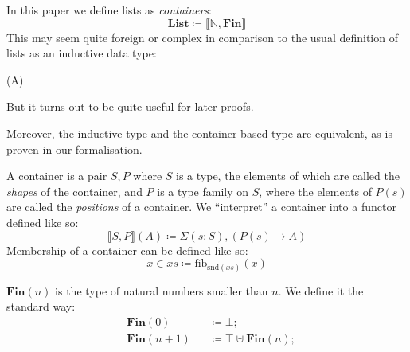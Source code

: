 \begin{definition} \label{List}
  In this paper we define lists as \emph{containers}:
  \begin{equation}
    \mathbf{List} \coloneqq \llbracket \mathbb{N} , \mathbf{Fin} \rrbracket
  \end{equation}
  This may seem quite foreign or complex in comparison to the usual definition
  of lists as an inductive data type:
  \begin{inductivetype}{(A)}
  \end{inductivetype}
  But it turns out to be quite useful for later proofs.

  Moreover, the inductive type and the container-based type are equivalent, as
  is proven in our formalisation.
\end{definition}
\begin{definition}[Containers] \label{container-def}
  A container \cite{abbottContainersConstructingStrictly2005} is a pair
  \(S , P\) where \(S\) is a type, the elements of which are called
  the \emph{shapes} of the container, and \(P\) is a type family on \(S\), where
  the elements of \(P(s)\) are called the \emph{positions} of a container.
  We ``interpret'' a container into a functor defined like so:
  \begin{equation} \label{container-interp}
    \llbracket S , P \rrbracket(A) \coloneqq \Sigma {(s : S)} , \left( P(s) \rightarrow A \right)
  \end{equation}
  Membership of a container can be defined like so:
  \begin{equation} \label{container-membership}
    x \in \mathit{xs} \coloneqq \text{fib}_{\text{snd}(\mathit{xs})}(x)
  \end{equation}
\end{definition}
\begin{definition} \label{Fin}
  \(\mathbf{Fin}(n)\) is the type of natural numbers smaller than \(n\). We
  define it the standard way:
  \begin{equation}
    \begin{alignedat}{3}
      & \mathbf{Fin}(0)     && \coloneqq \bot ; \\
      & \mathbf{Fin}(n + 1) && \coloneqq \top \uplus \mathbf{Fin}(n) ;
    \end{alignedat}
  \end{equation} 
\end{definition}
